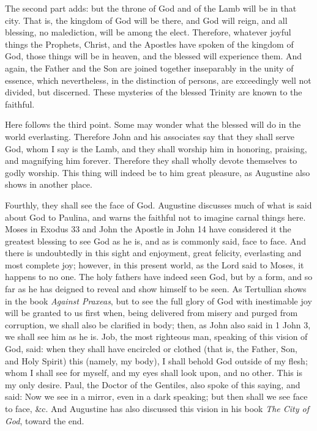 The second part adds: but the throne of God and of the Lamb will be in that city. That is, the kingdom of God will be there, and God will reign, and all blessing, no malediction, will be among the elect. Therefore, whatever joyful things the Prophets, Christ, and the Apostles have spoken of the kingdom of God, those things will be in heaven, and the blessed will experience them. And again, the Father and the Son are joined together inseparably in the unity of essence, which nevertheless, in the distinction of persons, are exceedingly well not divided, but discerned. These mysteries of the blessed Trinity are known to the faithful.

Here follows the third point. Some may wonder what the blessed will do in the world everlasting. Therefore John and his associates say that they shall serve God, whom I say is the Lamb, and they shall worship him in honoring, praising, and magnifying him forever. Therefore they shall wholly devote themselves to godly worship. This thing will indeed be to him great pleasure, as Augustine also shows in another place.

Fourthly, they shall see the face of God. Augustine discusses much of what is said about God to Paulina, and warns the faithful not to imagine carnal things here. Moses in Exodus 33 and John the Apostle in John 14 have considered it the greatest blessing to see God as he is, and as is commonly said, face to face. And there is undoubtedly in this sight and enjoyment, great felicity, everlasting and most complete joy; however, in this present world, as the Lord said to Moses, it happens to no one. The holy fathers have indeed seen God, but by a form, and so far as he has deigned to reveal and show himself to be seen. As Tertullian shows in the book \textit{Against Praxeas}, but to see the full glory of God with inestimable joy will be granted to us first when, being delivered from misery and purged from corruption, we shall also be clarified in body; then, as John also said in 1 John 3, we shall see him as he is. Job, the most righteous man, speaking of this vision of God, said: when they shall have encircled or clothed (that is, the Father, Son, and Holy Spirit) this (namely, my body), I shall behold God outside of my flesh; whom I shall see for myself, and my eyes shall look upon, and no other. This is my only desire. Paul, the Doctor of the Gentiles, also spoke of this saying, and said: Now we see in a mirror, even in a dark speaking; but then shall we see face to face, \&c. And Augustine has also discussed this vision in his book \textit{The City of God}, toward the end.

